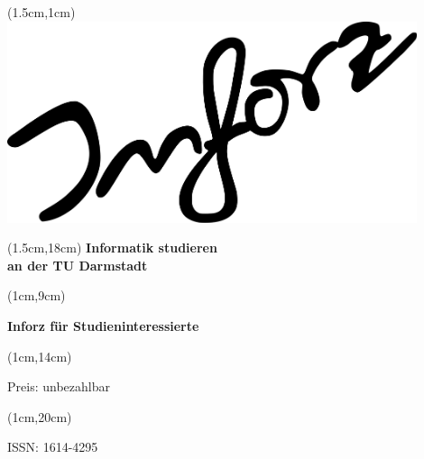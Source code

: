 \begin{titlepage}
    \begin{textblock*}{12cm}(1.5cm,1cm)
        \includegraphics[width=12cm]{../grafik/inforz}
    \end{textblock*}


    \begin{textblock*}{12cm}(1.5cm,18cm)
        \centering\Huge\sffamily\textbf{
            Informatik studieren \\
            an der TU Darmstadt}
    \end{textblock*}



    \begin{textblock*}{5cm}(1cm,9cm)
        \begin{rotate}{90}
            \sffamily\huge\textbf{
                Inforz für Studieninteressierte \the\year}
        \end{rotate}
    \end{textblock*}


    \begin{textblock*}{2cm}(1cm,14cm)
        \begin{rotate}{90}
            \sffamily\small Preis: unbezahlbar
        \end{rotate}
    \end{textblock*}


    \begin{textblock*}{2cm}(1cm,20cm)
        \begin{rotate}{90}
            \sffamily ISSN: 1614-4295
        \end{rotate}
    \end{textblock*}

\end{titlepage}
\newpage
